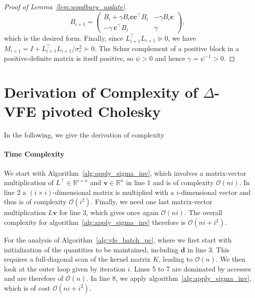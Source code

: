 \documentclass[onefignum,onetabnum]{siamart250211}
\newcommand{\R}{\mathbb{R}}
\begin{document}
\begin{proof}[Proof of Lemma~\ref{lem:woodbury_update}]
    \begin{equation*}
        B_{i+1} = 
        \begin{pmatrix}
            B_i + \gamma B_i\bm{c}\bm{c}^\top B_i & - \gamma B_i\bm{c} \\
            -\gamma\,\bm{c}^\top B_i & \gamma 
        \end{pmatrix},
    \end{equation*}
    which is the desired form. Finally, since $L_{i+1}^\top L_{i+1} \succeq 0$, we have $M_{i+1} = I + L_{i+1}^\top L_{i+1}/\sigma_\varepsilon^2 \succ 0$. The Schur complement of a positive block in a positive-definite matrix is itself positive, so $\psi > 0$ and hence $\gamma = \psi^{-1} > 0$.
\end{proof}

\section{Derivation of Complexity of $\Delta$-VFE pivoted Cholesky}\label{app:complexity}
In the following, we give the derivation of complexity 
\paragraph{Time Complexity}
We start with Algorithm~\ref{alg:apply_sigma_inv}, which involves a matrix-vector multiplication of $L^\top \in \R^{i \times n}$ and $\bm{v}\in\R^n$ in line 1 and is of complexity $\mathcal{O}(ni)$. In line 2 a $(i\times i)$-dimensional matrix is multiplied with a $i$-dimensional vector and thus is of complexity $\mathcal{O}(i^2)$. Finally, we need one last matrix-vector multiplication $L\bm{v}$  for line 3, which gives once again $\mathcal{O}(ni)$. The overall complexity for algorithm~\ref{alg:apply_sigma_inv} therefore is $\mathcal{O}(ni + i^2)$. 

For the analysis of Algorithm~\ref{alg:vfe_batch_pc}, where we first start with initialization of the quantities to be maintained, including $\bm{d}$ in line 3. This requires a full-diagonal scan of the kernel matrix $K$, leading to $\mathcal{O}(n)$. We then look at the outer loop given by iteration $i$. Lines 5 to 7 are dominated by accesses and are therefore of $\mathcal{O}(n)$. In line 8, we apply algorithm~\ref{alg:apply_sigma_inv}, which is of cost $\mathcal{O}(ni+i^2)$. 
\end{document}
